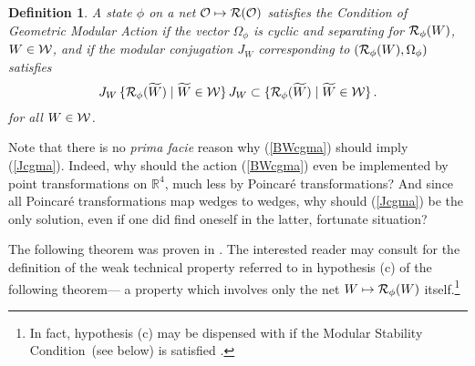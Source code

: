 \documentclass[12pt]{article}
\newtheorem{definition}[theorem]{Definition}
\def\msc{Modular Stability Condition}
\def\Os{{\cal O}}
\def\Rs{{\cal R}}
\def\Ws{{\cal W}}
\def\RR{{\mathbb R}}
\begin{document}
\begin{definition}
A state $\phi$ on a net $\Os \mapsto \Rs(\Os)$ satisfies the 
\textnormal{Condition of Geometric Modular Action} if the vector
$\Omega_\phi$ is cyclic and separating for $\Rs_\phi(W)$, $W \in \Ws$,
and if the modular conjugation $J_W$ corresponding to 
$(\Rs_\phi(W),\Omega_\phi)$ satisfies
%
\begin{equation}
J_{W} \, \{ \Rs_\phi(\widetilde{W}) \mid \widetilde{W} \in \Ws \} \, J_{W}  
\subset \{ \Rs_\phi(\widetilde{W}) \mid \widetilde{W} \in \Ws \} \, .
\end{equation}
%
for all $W \in \Ws$.
\end{definition}

     Note that there is no {\it prima facie} reason why (\ref{BWcgma})
should imply (\ref{Jcgma}). Indeed, why should the action
(\ref{BWcgma}) even be implemented by point transformations on $\RR^4$,
much less by Poincar\'e transformations? And since all Poincar\'e
transformations map wedges to wedges, why should (\ref{Jcgma}) be the
only solution, even if one did find oneself in the latter, fortunate 
situation?

     The following theorem was proven in \cite{BDFS,BS3}. The
interested reader may consult \cite{BS3} for the definition of the
weak technical property referred to in hypothesis (c) of the following
theorem--- a property which involves only the net $W \mapsto \Rs_\phi(W)$
itself.\footnote{In fact, hypothesis (c) may be dispensed with 
if the \msc \, (see below) is satisfied \cite{BS3}.} 
\end{document}
